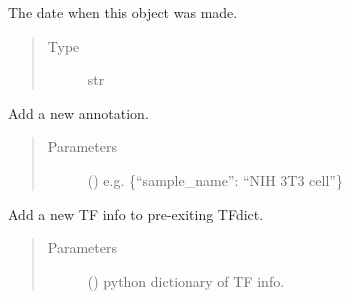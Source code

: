 \documentclass[letterpaper,10pt,english]{sphinxmanual}
\begin{document}
\begin{fulllineitems}
\begin{fulllineitems}
\end{fulllineitems}


\begin{fulllineitems}
\label{\detokenize{modules/celloracle:celloracle.Net.object_initiation_date}}
The date when this object was made.
\begin{quote}\begin{description}
\item[{Type}] \leavevmode
str

\end{description}\end{quote}

\end{fulllineitems}


\begin{fulllineitems}
\label{\detokenize{modules/celloracle:celloracle.Net.addAnnotation}}
Add a new annotation.
\begin{quote}\begin{description}
\item[{Parameters}] \leavevmode
{} () \textendash{} e.g. \{“sample\_name”: “NIH 3T3 cell”\}

\end{description}\end{quote}

\end{fulllineitems}


\begin{fulllineitems}
\label{\detokenize{modules/celloracle:celloracle.Net.addTFinfo_dictionary}}
Add a new TF info to pre-exiting TFdict.
\begin{quote}\begin{description}
\item[{Parameters}] \leavevmode
{} () \textendash{} python dictionary of TF info.


\end{description}
\end{quote}
\end{fulllineitems}
\end{fulllineitems}
\end{document}
